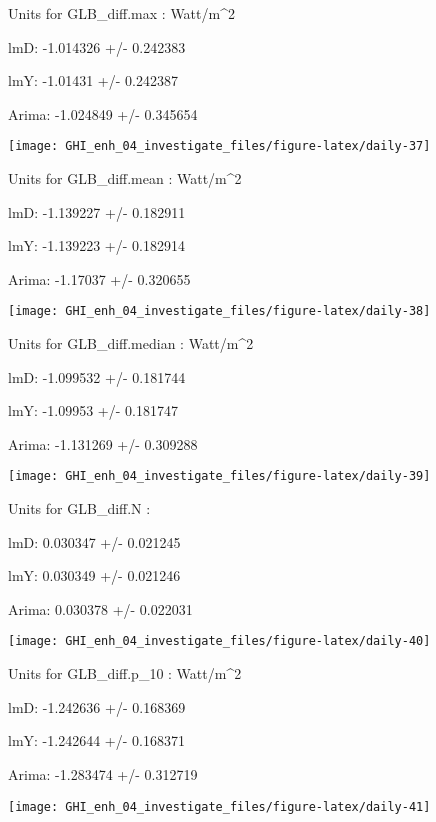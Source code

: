\documentclass[
  10pt,
  a4paper,oneside]{article}
\begin{document}
Units for GLB\_diff.max : Watt/m\^{}2

lmD: -1.014326 +/- 0.242383

lmY: -1.01431 +/- 0.242387

Arima: -1.024849 +/- 0.345654

\begin{center}\texttt{[image: GHI\_enh\_04\_investigate\_files/figure-latex/daily-37]} \end{center}

Units for GLB\_diff.mean : Watt/m\^{}2

lmD: -1.139227 +/- 0.182911

lmY: -1.139223 +/- 0.182914

Arima: -1.17037 +/- 0.320655

\begin{center}\texttt{[image: GHI\_enh\_04\_investigate\_files/figure-latex/daily-38]} \end{center}

Units for GLB\_diff.median : Watt/m\^{}2

lmD: -1.099532 +/- 0.181744

lmY: -1.09953 +/- 0.181747

Arima: -1.131269 +/- 0.309288

\begin{center}\texttt{[image: GHI\_enh\_04\_investigate\_files/figure-latex/daily-39]} \end{center}

Units for GLB\_diff.N :

lmD: 0.030347 +/- 0.021245

lmY: 0.030349 +/- 0.021246

Arima: 0.030378 +/- 0.022031

\begin{center}\texttt{[image: GHI\_enh\_04\_investigate\_files/figure-latex/daily-40]} \end{center}

Units for GLB\_diff.p\_10 : Watt/m\^{}2

lmD: -1.242636 +/- 0.168369

lmY: -1.242644 +/- 0.168371

Arima: -1.283474 +/- 0.312719

\begin{center}\texttt{[image: GHI\_enh\_04\_investigate\_files/figure-latex/daily-41]} \end{center}
\end{document}

